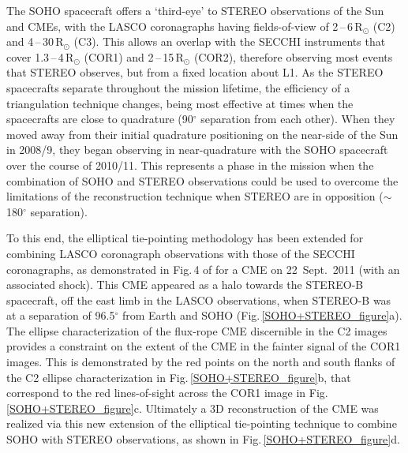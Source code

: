 \documentclass[preprint2]{aastex}
\begin{document}
The SOHO spacecraft offers a `third-eye' to STEREO observations of the Sun and CMEs, with the LASCO coronagraphs having fields-of-view of 2\,--\,6\,R$_{\odot}$ (C2) and 4\,--\,30\,R$_{\odot}$ (C3). This allows an overlap with the SECCHI instruments that cover 1.3\,--\,4\,R$_{\odot}$ (COR1) and 2\,--\,15\,R$_{\odot}$ (COR2), therefore observing most events that STEREO observes, but from a fixed location about L1. As the STEREO spacecrafts separate throughout the mission lifetime, the efficiency of a triangulation technique changes, being most effective at times when the spacecrafts are close to quadrature (90$^{\circ}$ separation from each other). When they moved away from their initial quadrature positioning on the near-side of the Sun in 2008/9, they began observing in near-quadrature with the SOHO spacecraft over the course of 2010/11. This represents a phase in the mission when the combination of SOHO and STEREO observations could be used to overcome the limitations of the reconstruction technique when STEREO are in opposition ($\sim$180$^{\circ}$ separation).

To this end, the elliptical tie-pointing methodology has been extended for combining LASCO coronagraph observations with those of the SECCHI coronagraphs, as demonstrated in Fig.\,4 of \citealt{2013_natphys_Carley} for a CME on 22~Sept.~2011 (with an associated shock). This CME appeared as a halo towards the STEREO-B spacecraft, off the east limb in the LASCO observations, when STEREO-B was at a separation of 96.5$^{\circ}$ from Earth and SOHO (Fig.\,\ref{SOHO+STEREO_figure}a). The ellipse characterization of the flux-rope CME discernible in the C2 images provides a constraint on the extent of the CME in the fainter signal of the COR1 images. This is demonstrated by the red points on the north and south flanks of the C2 ellipse characterization in Fig.\,\ref{SOHO+STEREO_figure}b, that correspond to the red lines-of-sight across the COR1 image in Fig.\,\ref{SOHO+STEREO_figure}c. Ultimately a 3D reconstruction of the CME was realized via this new extension of the elliptical tie-pointing technique to combine SOHO with STEREO observations, as shown in Fig.\,\ref{SOHO+STEREO_figure}d.
\end{document}
